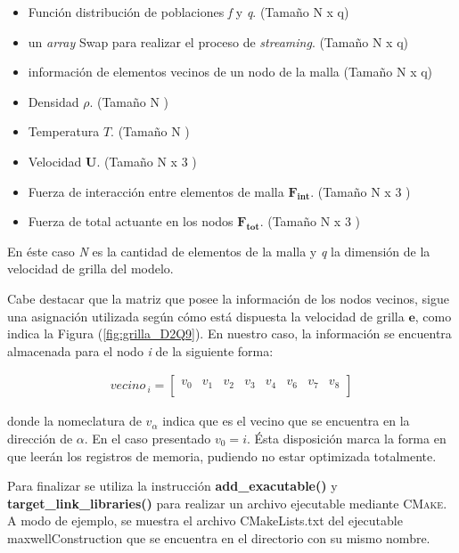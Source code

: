 \begin{itemize}
	\item Función distribución de poblaciones \textit{f} y \textit{q}. (Tamaño N x q)
	\item un \textit{array} Swap para realizar el proceso de \textit{streaming}. (Tamaño N x q)
	\item información de elementos vecinos de un nodo de la malla (Tamaño N x q)
	\item Densidad $\rho$. (Tamaño N )
	\item Temperatura $T$. (Tamaño N )
	\item Velocidad $\mathbf{U}$. (Tamaño N x 3 )
	\item Fuerza de interacción entre elementos de malla $\mathbf{F_{int}}$. (Tamaño N x 3 )
	\item Fuerza de total actuante en los nodos $\mathbf{F_{tot}}$. (Tamaño N x 3 )
	
\end{itemize}

En éste caso \textit{N} es la cantidad de elementos de la malla y \textit{q} la dimensión de la velocidad de grilla del modelo.

Cabe destacar que la matriz que posee la información de los nodos vecinos, sigue una asignación utilizada según cómo está dispuesta la velocidad de grilla $\mathbf{e}$, como indica la Figura (\ref{fig:grilla_D2Q9}). En nuestro caso, la información se encuentra almacenada para el nodo \textit{i} de la siguiente forma:

\begin{align*}
	vecino_{\>i} =
	\begin{bmatrix}
	v_0 & v_1 & v_2 & v_3 & v_4 & v_6 & v_7 & v_8 \\
	\end{bmatrix}
\end{align*}

donde la nomeclatura de $v_\alpha$ indica que es el vecino que se encuentra en la dirección de $\alpha$. En el caso presentado $v_0 = i$. Ésta disposición marca la forma en que leerán los registros de memoria, pudiendo no estar optimizada totalmente.

Para finalizar se utiliza la instrucción \textbf{add\_exacutable()} y \textbf{target\_link\_libraries()} para realizar un archivo ejecutable mediante \textsc{CMake}. A modo de ejemplo, se muestra el archivo CMakeLists.txt del ejecutable maxwellConstruction que se encuentra en el directorio con su mismo nombre.

